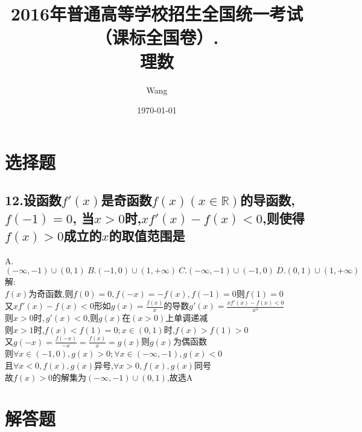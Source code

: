 \documentclass[UTF8]{ctexart}
\begin{document}
\title{2016年普通高等学校招生全国统一考试
    （课标全国卷\uppercase\expandafter{}）.\\
    \textbf{理数}}
\author{Wang}
\date{\today}
\maketitle

\section{选择题}
\subsection{12.设函数$f'(x)$是奇函数$f(x)(x \in \mathbb{R})$的导函数,$f(-1)=0$,
当$x>0$时,$xf'(x)-f(x)<0$,则使得$f(x)>0$成立的$x$的取值范围是}
A.$(-\infty,-1)\cup(0,1)\ B.(-1,0)\cup(1,+\infty)\ 
C.(-\infty,-1)\cup(-1,0)\ D.(0,1)\cup(1,+\infty)$\\

解:\\
$f(x)$为奇函数,则$f(0)=0,f(-x)=-f(x),f(-1)=0$则$f(1)=0$\\
又$xf'(x)-f(x)<0$形如$g(x)=\frac{f(x)}{x}$的导数$g'(x)=\frac{xf'(x)-f(x)<0}{x^2}$\\
则$x>0时,g'(x)<0$,则$g(x)$在$(x>0)$上单调递减\\
则$x>1$时,$f(x)<f(1)=0;x\in(0,1)$时,$f(x)>f(1)>0$\\
又$g(-x)=\frac{f(-x)}{-x}=\frac{f(x)}{x}=g(x)$则$g(x)$为偶函数\\
则$\forall x\in(-1,0),g(x)>0;\forall x\in(-\infty,-1),g(x)<0$\\
且$\forall x<0,f(x),g(x)$异号,$\forall x>0,f(x),g(x)$同号\\
故$f(x)>0$的解集为$(-\infty,-1)\cup(0,1)$,故选A
\section{解答题}
\end{document}
